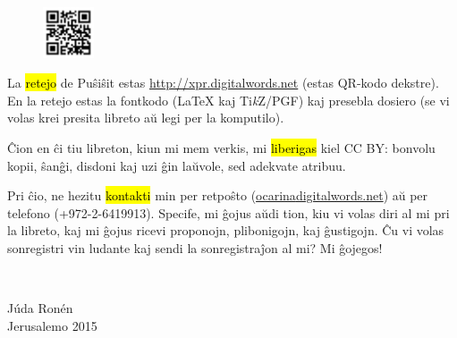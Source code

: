 
\begin{figure}\vspace{-\baselineskip}\includegraphics[width=1.5cm]{retejo.png}\end{figure}
La \hl{retejo} de Puŝiŝit estas \url{http://xpr.digitalwords.net} (estas QR-kodo dekstre). En la retejo estas la fontkodo ({\LaTeX} kaj {Ti\textit{k}Z/PGF}) kaj presebla dosiero (se vi volas krei presita libreto aŭ legi per la komputilo).

Ĉion en ĉi tiu libreton, kiun mi mem verkis, mi \hl{liberigas} kiel CC BY: bonvolu kopii, ŝanĝi, disdoni kaj uzi ĝin laŭvole, sed adekvate atribuu.

Pri ĉio, ne hezitu \hl{kontakti} min per retpoŝto ({\url{ocarina}\url{digitalwords.net}}) aŭ per telefono (+972-2-6419913). Specife, mi ĝojus aŭdi tion, kiu vi volas diri al mi pri la libreto, kaj mi ĝojus ricevi proponojn, plibonigojn, kaj ĝustigojn. Ĉu vi volas sonregistri vin ludante kaj sendi la sonregistraĵon al mi? Mi ĝojegos! 


\vspace{\baselineskip}
~\hfill
\begin{minipage}{3cm}
	Júda Ronén\\
	Jerusalemo 2015\\
\end{minipage}
